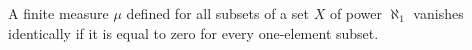 A finite measure $\mu$ defined for all subsets of a set $X$ of power $\aleph_1$ vanishes identically if it is equal to zero for every one-element subset.
